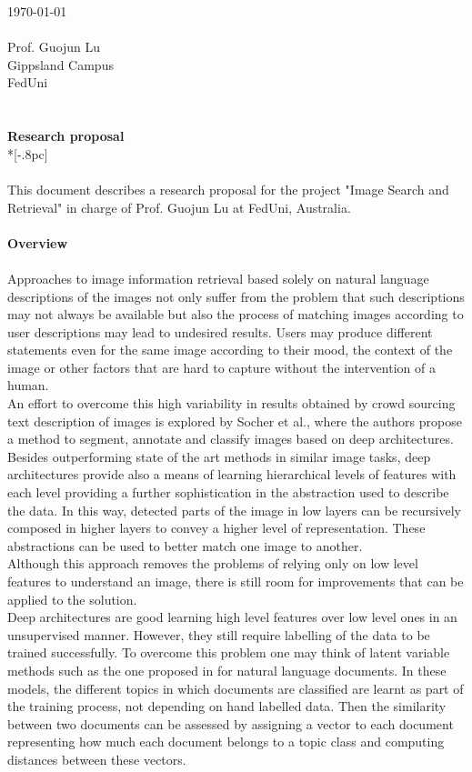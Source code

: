 \documentclass[letter,12pt,english]{article}
\begin{document}
{ \hfill \today \\ \\ 
Prof. Guojun Lu\\
Gippsland Campus\\
FedUni\\
\\
\\

\large
\bf Research proposal} \\*[-.8pc]
\\
\\

This document describes a research proposal for the project "Image Search and Retrieval" in charge of Prof. Guojun Lu
at FedUni, Australia. \\\\
{\bf Overview}\\\\
Approaches to image information retrieval based solely on natural language descriptions of the images not only suffer
from the problem that such descriptions may not always be available but also the process of matching images according
to user descriptions may lead to undesired results. Users may produce different statements even for the same image
according to their mood, the context of the image or other factors that are hard to capture without the
intervention of a human.\\
An effort to overcome this high variability in results obtained by crowd sourcing text 
description of images is explored by Socher\cite{socher} et al., where the authors propose a method to segment,
annotate and classify images based on deep architectures.\\
Besides outperforming state of the art methods in similar image tasks, deep architectures provide also a means
of learning hierarchical
levels of features with each level providing a further sophistication in the abstraction used to describe the data.
In this way, detected parts of the image in low layers can be recursively composed in higher layers to convey a 
higher level of representation. These abstractions can be used to better match one image to another.\\
Although this approach removes the problems of relying only on low level features to understand an image, there is
still room for improvements that can be applied to the solution.\\
Deep architectures are good learning high level features over low level ones in an unsupervised manner. However,
they still require labelling of the data to be trained successfully. To overcome this problem one may think of latent
variable methods such as the one proposed in\cite{lda} for natural language documents. In these models, the different
topics in which documents are classified are learnt as part of the training process, not depending on hand labelled
data. Then the similarity between two documents can be assessed by assigning a vector to each document representing
how much each document belongs to a topic class and computing distances between these vectors.\\\\
\end{document}
